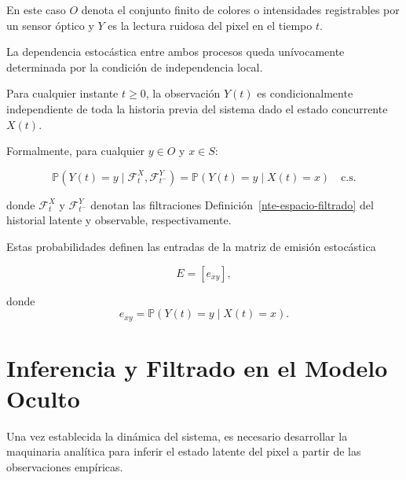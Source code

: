 \documentclass[
  spanish,
  us-letterpaper,
  DIV=11,
  numbers=noendperiod]{scrreprt}
\newcounter{quartocalloutnteno}
\newcommand{\quartocalloutnte}[1]{\refstepcounter{quartocalloutnteno}\label{#1}}
\begin{document}
En este caso \(O\) denota el conjunto finito de colores o intensidades
registrables por un sensor óptico y \(Y\) es la lectura ruidosa del
pixel en el tiempo \(t\).

\begin{tcolorbox}[enhanced jigsaw, coltitle=black, arc=.35mm, toptitle=1mm, bottomrule=.15mm, rightrule=.15mm, toprule=.15mm, colframe=quarto-callout-note-color-frame, colback=white, bottomtitle=1mm, title=\textcolor{quarto-callout-note-color}{\faInfo}\hspace{0.5em}{Nota \ref*{nte-matriz-emision}: Definición (Matriz de Emisión e Independencia Condicional)}, titlerule=0mm, leftrule=.75mm, left=2mm, opacitybacktitle=0.6, opacityback=0, colbacktitle=quarto-callout-note-color!10!white, breakable]

\quartocalloutnte{nte-matriz-emision} 

La dependencia estocástica entre ambos procesos queda unívocamente
determinada por la condición de independencia local.

Para cualquier instante \(t\ge0\), la observación \(Y(t)\) es
condicionalmente independiente de toda la historia previa del sistema
dado el estado concurrente \(X(t)\).

Formalmente, para cualquier \(y\in O\) y \(x\in S\):

\[
\mathbb{P}(Y(t)=y \mid \mathcal{F}_t^X,\mathcal{F}_{t^-}^Y)
=
\mathbb{P}(Y(t)=y \mid X(t)=x)
\quad
\text{c.s.}
\]

donde \(\mathcal{F}_t^X\) y \(\mathcal{F}_{t^-}^Y\) denotan las
filtraciones Definición~\ref{nte-espacio-filtrado} del historial latente
y observable, respectivamente.

Estas probabilidades definen las entradas de la matriz de emisión
estocástica

\[
E=[e_{xy}],
\]

donde \[
e_{xy}
=
\mathbb{P}(Y(t)=y \mid X(t)=x).
\]

\end{tcolorbox}


\chapter{Inferencia y Filtrado en el Modelo
Oculto}\label{inferencia-y-filtrado-en-el-modelo-oculto}

Una vez establecida la dinámica del sistema, es necesario desarrollar la
maquinaria analítica para inferir el estado latente del pixel a partir
de las observaciones empíricas.
\end{document}
